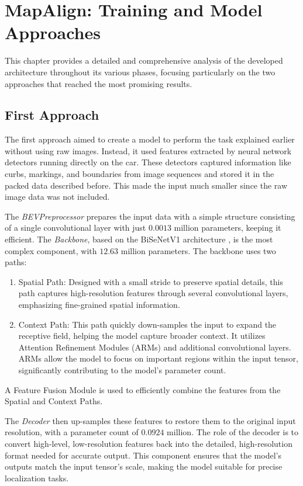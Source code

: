 \NoBgThispage
\chapter{MapAlign: Training and Model Approaches}

This chapter provides a detailed and comprehensive analysis of the developed architecture throughout its various phases, focusing particularly on the two approaches that reached the most promising results.

\section{First Approach}

The first approach aimed to create a model to perform the task explained earlier without using raw images. Instead, it used features extracted by neural network detectors running directly on the car. These detectors captured information like curbs, markings, and boundaries from image sequences and stored it in the packed data described before. This made the input much smaller since the raw image data was not included.

The \textit{BEVPreprocessor} prepares the input data with a simple structure consisting of a single convolutional layer with just $0.0013$ million parameters, keeping it efficient. 
The \textit{Backbone}, based on the BiSeNetV1 architecture \cite{DBLP:journals/corr/abs-1808-00897}, is the most complex component, with $12.63$ million parameters. The backbone uses two paths: 
\begin{enumerate}
    \item Spatial Path: Designed with a small stride to preserve spatial details, this path captures high-resolution features through several convolutional layers, emphasizing fine-grained spatial information.
    \item Context Path: This path quickly down-samples the input to expand the receptive field, helping the model capture broader context. It utilizes Attention Refinement Modules (ARMs) and additional convolutional layers. ARMs allow the model to focus on important regions within the input tensor, significantly contributing to the model's parameter count.
\end{enumerate}
A Feature Fusion Module is used to efficiently combine the features from the Spatial and Context Paths.

The \textit{Decoder} then up-samples these features to restore them to the original input resolution, with a parameter count of $0.0924$ million. The role of the decoder is to convert high-level, low-resolution features back into the detailed, high-resolution format needed for accurate output. This component ensures that the model’s outputs match the input tensor's scale, making the model suitable for precise localization tasks.

